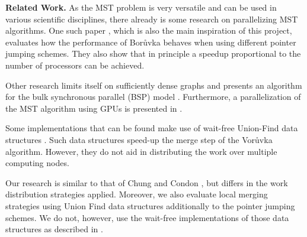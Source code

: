 \documentclass[letterpaper]{article}
\newcommand{\mypar}[1]{{\bf #1.}}
\begin{document}
\mypar{Related Work}
As the MST problem is very versatile and can be used in various scientific disciplines, there already is some research
on parallelizing MST algorithms. One such paper \cite{chung1996parallel}, which is also the main inspiration of this
project, evaluates how the performance of Bor\r{u}vka behaves when using different pointer jumping schemes. They also
show that in principle a speedup proportional to the number of processors can be achieved.

Other research limits itself on sufficiently dense \linebreak graphs and presents an algorithm for the bulk synchronous
parallel (BSP) model \cite{dehne1998practical}. Furthermore, a parallelization of the MST algorithm using GPUs is
presented in \cite{de2017parallel}.

Some implementations that can be found make use of wait-free Union-Find data structures \cite{wfuf}. Such data
structures speed-up the merge step of the Vor\r{u}vka algorithm. However, they do not aid in distributing the work over
multiple computing nodes.

Our research is similar to that of Chung and Condon \cite{chung1996parallel}, but differs in the work distribution
strategies applied. Moreover, we also evaluate local merging strategies using Union Find data structures additionally to
the pointer jumping schemes. We do not, however, use the wait-free implementations of those data structures as described
in \cite{wfuf}.
\end{document}

